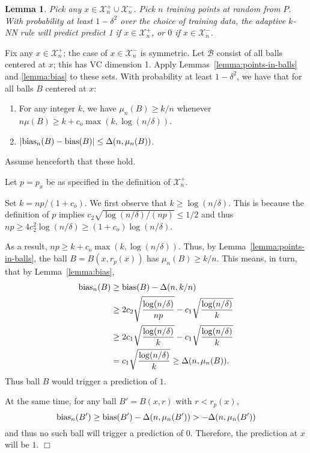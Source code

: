 \documentclass{article}
\def\X{{\mathcal X}}
\def\B{{\mathcal B}}
\def\bias{{\rm bias}}
\newtheorem{lemma}[thm]{Lemma}
\newenvironment{proof}{\noindent {\sc Proof:}}{$\Box$ \medskip}
\begin{document}
\begin{lemma}
Pick any $x \in \X^+_n \cup \X^-_n$. Pick $n$ training points at random from $P$. With probability at least $1-\delta^2$ over the choice of training data, the adaptive $k$-NN rule will predict predict 1 if $x \in \X^+_n$, or $0$ if $x \in \X^-_n$.
\label{lemma:good-sets}
\end{lemma}
\begin{proof}
Fix any $x \in \X^+_n$; the case of $x \in \X^-_n$ is symmetric. Let $\B$ consist of all balls centered at $x$; this has VC dimension 1. Apply Lemmas~\ref{lemma:points-in-balls} and \ref{lemma:bias} to these sets. With probability at least $1-\delta^2$, we have that for all balls $B$ centered at $x$:
\begin{enumerate}
\item For any integer $k$, we have $\mu_n(B) \geq k/n$ whenever $n \mu(B) \geq k + c_o \max(k, \log (n/\delta))$.
\item $|\bias_n(B) - \bias(B)| \leq \Delta(n, \mu_n(B))$.
\end{enumerate}
Assume henceforth that these hold.

Let $p = p_x$ be as specified in the definition of $\X^+_n$.

Set $k = np/(1 + c_o)$. We first observe that $k \geq \log (n/\delta)$. This is because the definition of $p$ implies $c_2 \sqrt{\log (n/\delta)/(np)} \leq 1/2$ and thus $np \geq 4 c_2^2 \log (n/\delta) \geq (1+c_o) \log (n/\delta)$.

As a result, $np \geq k + c_o \max(k, \log (n/\delta))$. Thus, by Lemma~\ref{lemma:points-in-balls}, the ball $B = B(x, r_p(x))$ has $\mu_n(B) \geq k/n$. This means, in turn, that by Lemma~\ref{lemma:bias},
\begin{align*}
\bias_n(B) &\geq \bias(B) - \Delta(n, k/n) \\
&\geq 2c_2 \sqrt{\frac{\log (n/\delta)}{np}} - c_1 \sqrt{\frac{\log (n/\delta)}{k}} \\
&\geq 2c_1 \sqrt{\frac{\log (n/\delta)}{k}} - c_1 \sqrt{\frac{\log (n/\delta)}{k}} \\
&= c_1 \sqrt{\frac{\log (n/\delta)}{k}} \geq \Delta(n, \mu_n(B)) .
\end{align*}
Thus ball $B$ would trigger a prediction of $1$.

At the same time, for any ball $B' = B(x, r)$ with $r < r_p(x)$,
$$ \bias_n(B') \geq \bias(B') - \Delta(n, \mu_n(B')) > -\Delta(n, \mu_n(B')) $$
and thus no such ball will trigger a prediction of $0$. Therefore, the prediction at $x$ will be $1$.
\end{proof}
\end{document}
